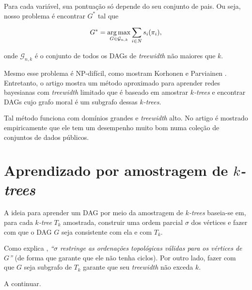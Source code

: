 Para cada variável, sua pontuação só depende do seu conjunto de pais. Ou seja, nosso problema é encontrar $G^*$ tal que

$$G^* = \operatorname*{arg\,max}_{G \in \mathcal{G}_{n,k}} \sum_{i \in N} s_i(\pi_i),$$

onde $\mathcal{G}_{n,k}$ é o conjunto de todos os DAGs de \emph{treewidth} não maiores que $k$.

Mesmo esse problema é NP-difícil, como mostram Korhonen e Parviainen \cite{korhonen}. Entretanto, o artigo \cite{maua} mostra um método aproximado para aprender redes bayesianas com \emph{treewidth} limitado que é baseado em amostrar \emph{$k$-trees} e encontrar DAGs cujo grafo moral é um subgrafo dessas \emph{$k$-trees}.

Tal método funciona com domínios grandes e \emph{treewidth} alto. No artigo é mostrado empiricamente que ele tem um desempenho muito bom numa coleção de conjuntos de dados públicos.

\section{Aprendizado por amostragem de \emph{$k$-trees}}
\label{sec:aprendizado}

A ideia para aprender um DAG por meio da amostragem de \emph{$k$-trees} baseia-se em, para cada \emph{$k$-tree} $T_k$ amostrada, construir uma ordem parcial $\sigma$ dos vértices e fazer com que o DAG $G$ seja consistente com ela e com $T_k$.

Como explica \cite{maua}, \emph{``$\sigma$ restringe as ordenações topológicas válidas para os vértices de $G$''} (de forma que garante que ele não tenha ciclos). Por outro lado, fazer com que $G$ seja subgrafo de $T_k$ garante que seu \emph{treewidth} não exceda $k$.

A continuar. %

